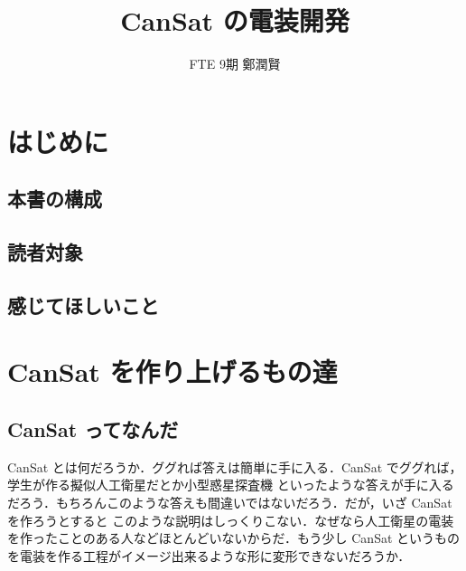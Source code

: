 \documentclass[dvipdfmx]{jsarticle}
\begin{document}
\title{CanSat の電装開発}
\author{FTE 9期 \quad 鄭潤賢}
\date{}         %
\maketitle

\tableofcontents
\clearpage


\section{はじめに}

\subsection{本書の構成}

\subsection{読者対象}

\subsection{感じてほしいこと}


\clearpage

\section{CanSat を作り上げるもの達}

\subsection{CanSat ってなんだ}

CanSat とは何だろうか．ググれば答えは簡単に手に入る．CanSat でググれば，学生が作る擬似人工衛星だとか小型惑星探査機
といったような答えが手に入るだろう．もちろんこのような答えも間違いではないだろう．だが，いざ CanSat を作ろうとすると
このような説明はしっくりこない．なぜなら人工衛星の電装を作ったことのある人などほとんどいないからだ．もう少し CanSat 
というものを電装を作る工程がイメージ出来るような形に変形できないだろうか．
\end{document}
